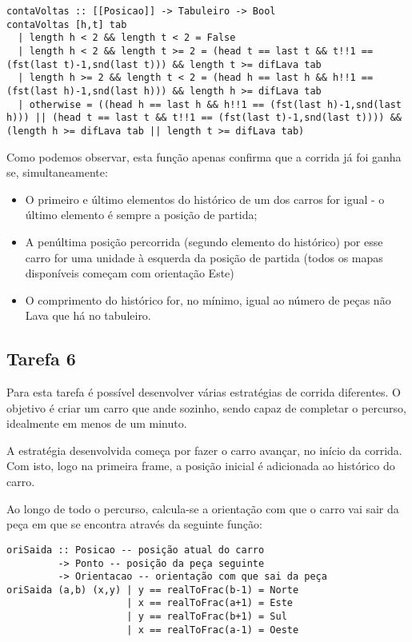 \documentclass[a4paper]{report}
\begin{document}
\begin{lstlisting}
contaVoltas :: [[Posicao]] -> Tabuleiro -> Bool
contaVoltas [h,t] tab 
  | length h < 2 && length t < 2 = False
  | length h < 2 && length t >= 2 = (head t == last t && t!!1 == (fst(last t)-1,snd(last t))) && length t >= difLava tab
  | length h >= 2 && length t < 2 = (head h == last h && h!!1 == (fst(last h)-1,snd(last h))) && length h >= difLava tab
  | otherwise = ((head h == last h && h!!1 == (fst(last h)-1,snd(last h))) || (head t == last t && t!!1 == (fst(last t)-1,snd(last t)))) && (length h >= difLava tab || length t >= difLava tab)
\end{lstlisting}

Como podemos observar, esta função apenas confirma que a corrida já foi ganha se, simultaneamente:

\begin{itemize}
    \item O primeiro e último elementos do histórico de um dos carros for igual - o último elemento é sempre a posição de partida;
    \item A penúltima posição percorrida (segundo elemento do histórico) por esse carro for uma unidade à esquerda da posição de partida (todos os mapas disponíveis começam com orientação Este)
    \item O comprimento do histórico for, no mínimo, igual ao número de peças não Lava que há no tabuleiro.
\end{itemize}

\subsection{Tarefa 6}

Para esta tarefa é possível desenvolver várias estratégias de corrida diferentes. O objetivo é criar um carro que ande sozinho, sendo capaz de completar o percurso, idealmente em menos de um minuto.

A estratégia desenvolvida começa por fazer o carro avançar, no início da corrida. Com isto, logo na primeira frame, a posição inicial é adicionada ao histórico do carro.

Ao longo de todo o percurso, calcula-se a orientação com que o carro vai sair da peça em que se encontra através da seguinte função:

\begin{verbatim}
oriSaida :: Posicao -- posição atual do carro
         -> Ponto -- posição da peça seguinte
         -> Orientacao -- orientação com que sai da peça
oriSaida (a,b) (x,y) | y == realToFrac(b-1) = Norte
                     | x == realToFrac(a+1) = Este
                     | y == realToFrac(b+1) = Sul
                     | x == realToFrac(a-1) = Oeste
\end{verbatim}
\end{document}
